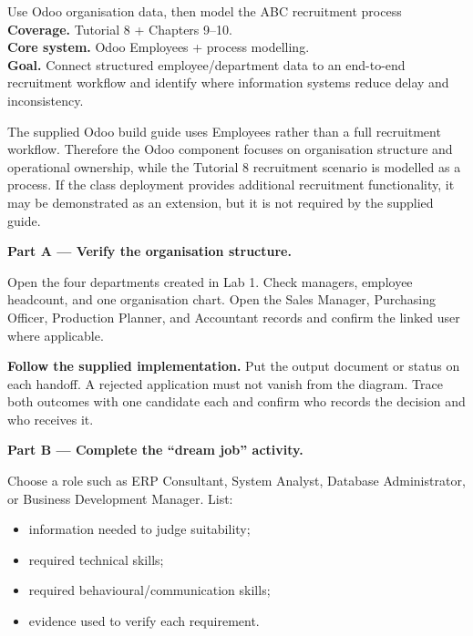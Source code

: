 
\begin{labproject}{Use Odoo organisation data, then model the ABC recruitment process}
\textbf{Coverage.} Tutorial 8 + Chapters 9--10.\\
\textbf{Core system.} Odoo Employees + process modelling.\\
\textbf{Goal.} Connect structured employee/department data to an end-to-end recruitment workflow and identify where information systems reduce delay and inconsistency.




\begin{labmode}
The supplied Odoo build guide uses Employees rather than a full recruitment workflow. Therefore the Odoo component focuses on organisation structure and operational ownership, while the Tutorial 8 recruitment scenario is modelled as a process. If the class deployment provides additional recruitment functionality, it may be demonstrated as an extension, but it is not required by the supplied guide.
\end{labmode}

\medskip\noindent\textbf{Part A --- Verify the organisation structure.}

Open the four departments created in Lab 1. Check managers, employee headcount, and one organisation chart. Open the Sales Manager, Purchasing Officer, Production Planner, and Accountant records and confirm the linked user where applicable.




\textbf{Follow the supplied implementation.} Put the output document or status on each handoff. A rejected application must not vanish from the diagram. Trace both outcomes with one candidate each and confirm who records the decision and who receives it.


\medskip\noindent\textbf{Part B --- Complete the ``dream job'' activity.}

Choose a role such as ERP Consultant, System Analyst, Database Administrator, or Business Development Manager. List:
\begin{itemize}
  \item information needed to judge suitability;
  \item required technical skills;
  \item required behavioural/communication skills;
  \item evidence used to verify each requirement.
\end{itemize}


\end{labproject}
